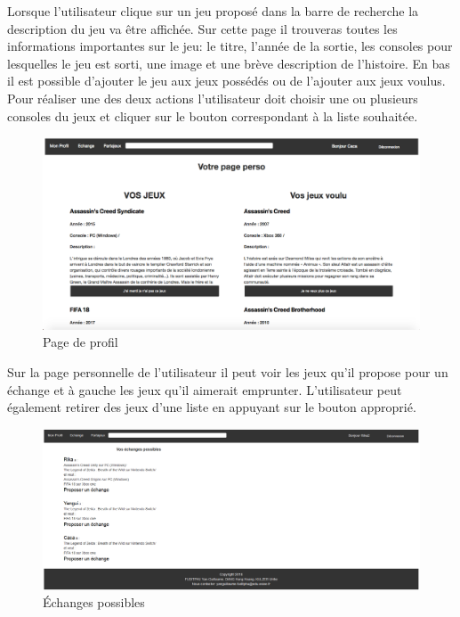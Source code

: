 \documentclass[a4paper,12pt,abstracton,titlepage]{scrartcl}
\begin{document}
\newpage
Lorsque l'utilisateur clique sur un jeu proposé dans la barre de recherche la description du jeu va être affichée. Sur cette page il trouveras toutes les informations importantes sur le jeu: le titre, l'année de la sortie, les consoles pour lesquelles le jeu est sorti, une image et une brève description de l'histoire. En bas il est possible d'ajouter le jeu aux jeux possédés ou de l'ajouter aux jeux voulus. Pour réaliser une des deux actions l'utilisateur doit choisir une ou plusieurs consoles du jeux et cliquer sur le bouton correspondant à la liste souhaitée.
\vspace{1cm}
\begin{figure}[!h]
  \centering
    \includegraphics[width=\textwidth]{./doc/03_profile.png}
	\caption{Page de profil}
	\label{profile}
\end{figure}

\newpage
Sur la page personnelle de l'utilisateur il peut voir les jeux qu'il propose pour un échange et à gauche les jeux qu'il aimerait emprunter. L'utilisateur peut également retirer des jeux d'une liste en appuyant sur le bouton approprié.\\

\vspace{1cm}
\begin{figure}[h]
  \centering
    \includegraphics[width=\textwidth]{./doc/04_echanges.png}
	\caption{Échanges possibles}
	\label{exch}
\end{figure}
\end{document}
